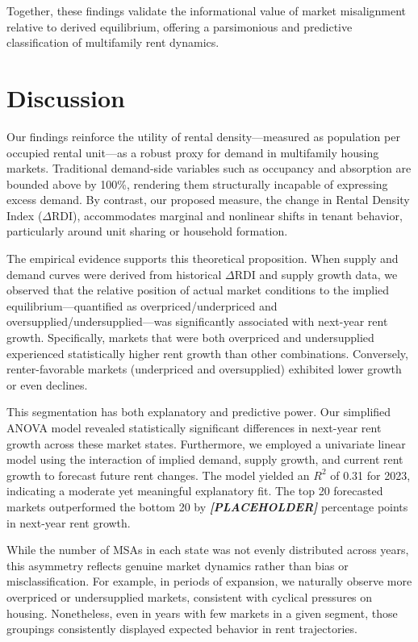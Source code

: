 \documentclass[sn-mathphys-num]{sn-jnl}%
\theoremstyle{thmstyleone}%
\theoremstyle{thmstyletwo}%
\theoremstyle{thmstylethree}%
\begin{document}
Together, these findings validate the informational value of market misalignment relative to derived equilibrium, offering a parsimonious and predictive classification of multifamily rent dynamics.

\section{Discussion}

Our findings reinforce the utility of rental density---measured as population per occupied rental unit---as a robust proxy for demand in multifamily housing markets. Traditional demand-side variables such as occupancy and absorption are bounded above by 100\%, rendering them structurally incapable of expressing excess demand. By contrast, our proposed measure, the change in Rental Density Index (\(\Delta\text{RDI}\)), accommodates marginal and nonlinear shifts in tenant behavior, particularly around unit sharing or household formation.

The empirical evidence supports this theoretical proposition. When supply and demand curves were derived from historical \(\Delta\text{RDI}\) and supply growth data, we observed that the relative position of actual market conditions to the implied equilibrium---quantified as overpriced/underpriced and oversupplied/undersupplied---was significantly associated with next-year rent growth. Specifically, markets that were both overpriced and undersupplied experienced statistically higher rent growth than other combinations. Conversely, renter-favorable markets (underpriced and oversupplied) exhibited lower growth or even declines. 

This segmentation has both explanatory and predictive power. Our simplified ANOVA model revealed statistically significant differences in next-year rent growth across these market states. Furthermore, we employed a univariate linear model using the interaction of implied demand, supply growth, and current rent growth to forecast future rent changes. The model yielded an \(R^2\) of 0.31 for 2023, indicating a moderate yet meaningful explanatory fit. The top 20 forecasted markets outperformed the bottom 20 by \textbf{\textit{[PLACEHOLDER]}} percentage points in next-year rent growth.

While the number of MSAs in each state was not evenly distributed across years, this asymmetry reflects genuine market dynamics rather than bias or misclassification. For example, in periods of expansion, we naturally observe more overpriced or undersupplied markets, consistent with cyclical pressures on housing. Nonetheless, even in years with few markets in a given segment, those groupings consistently displayed expected behavior in rent trajectories.
\end{document}
